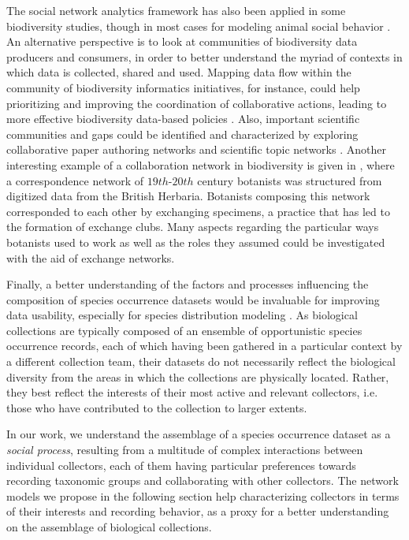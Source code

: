 {%
The social network analytics framework has also been applied in some biodiversity studies, though in most cases for modeling animal social behavior \cite{faust2011animal}.
An alternative perspective is to look at communities of biodiversity data producers and consumers, in order to better understand the myriad of contexts in which data is collected, shared and used.
%
Mapping data flow within the community of biodiversity informatics initiatives, for instance, could help prioritizing and improving the coordination of collaborative actions, leading to more effective biodiversity data-based policies \cite{Bingham2017}.
%
Also, important scientific communities and gaps could be identified and characterized by exploring collaborative paper authoring networks and scientific topic networks \cite{Borrett2014}. 
%
Another interesting example of a collaboration network in biodiversity is given in , where a correspondence network of $19th$-$20th$ century botanists was structured from digitized data from the British Herbaria.
Botanists composing this network corresponded to each other by exchanging specimens, a practice that has led to the formation of exchange clubs.
Many aspects regarding the particular ways botanists used to work as well as the roles they assumed could be investigated with the aid of exchange networks. 

Finally, a better understanding of the factors and processes influencing the composition of species occurrence datasets would be invaluable for improving data usability, especially for species distribution modeling \cite{Daru2017}.
As biological collections are typically composed of an ensemble of opportunistic species occurrence records, each of which having been gathered in a particular context by a different collection team, their datasets do not necessarily reflect the biological diversity from the areas in which the collections are physically located.
Rather, they best reflect the interests of their most active and relevant collectors, i.e. those who have contributed to the collection to larger extents. 
%

In our work, we understand the assemblage of a species occurrence dataset as a \emph{social process}, resulting from a multitude of complex interactions between individual collectors, each of them having particular preferences towards recording taxonomic groups and collaborating with other collectors.
The network models we propose in the following section help characterizing collectors in terms of their interests and recording behavior, as a proxy for a better understanding on the assemblage of biological collections.
  




}
